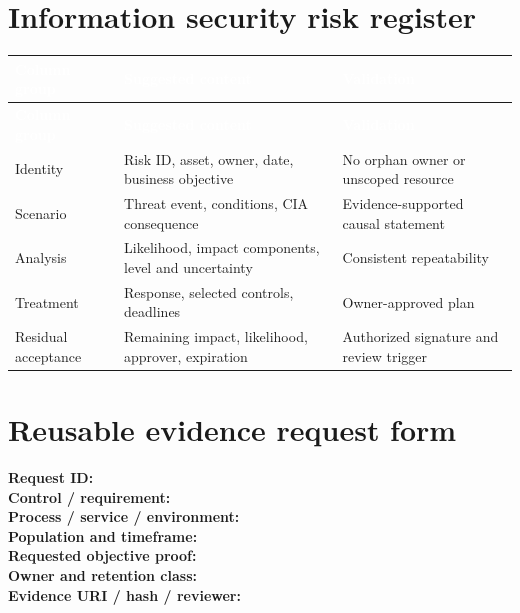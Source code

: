 \documentclass[11pt,letterpaper]{article}
\begin{document}
\section{Information security risk register}
\small{}\begin{longtable}{>{\raggedright\arraybackslash}p{}>{\raggedright\arraybackslash}p{}>{\raggedright\arraybackslash}p{}}
\rowcolor{navy} \textcolor{white}{\textbf{Column group}} & \textcolor{white}{\textbf{Suggested content}} & \textcolor{white}{\textbf{Validation}}\\
\endfirsthead
\rowcolor{navy} \textcolor{white}{\textbf{Column group}} & \textcolor{white}{\textbf{Suggested content}} & \textcolor{white}{\textbf{Validation}}\\
\endhead
Identity & Risk ID, asset, owner, date, business objective & No orphan owner or unscoped resource\\
Scenario & Threat event, conditions, CIA consequence & Evidence-supported causal statement\\
Analysis & Likelihood, impact components, level and uncertainty & Consistent repeatability\\
Treatment & Response, selected controls, deadlines & Owner-approved plan\\
Residual acceptance & Remaining impact, likelihood, approver, expiration & Authorized signature and review trigger\\
\end{longtable}\normalsize

\section{Reusable evidence request form}
\begin{tcolorbox}[title={Evidence request -- fill in for each sample},colback=pale,colframe=teal]
\textbf{Request ID:} \hrulefill\\[5pt]
\textbf{Control / requirement:} \hrulefill\\[5pt]
\textbf{Process / service / environment:} \hrulefill\\[5pt]
\textbf{Population and timeframe:} \hrulefill\\[5pt]
\textbf{Requested objective proof:} \hrulefill\\[5pt]
\textbf{Owner and retention class:} \hrulefill\\[5pt]
\textbf{Evidence URI / hash / reviewer:} \hrulefill
\end{tcolorbox}
\end{document}
